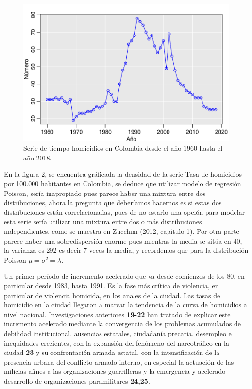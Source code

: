 \documentclass[a4paper]{article}\usepackage[]{graphicx}\usepackage[]{color}
\makeatletter
\def\maxwidth{ %
  \ifdim\Gin@nat@width>\linewidth
    \linewidth
  \else
    \Gin@nat@width
  \fi
}
\newenvironment{knitrout}{}{} %
\makeatother
\begin{document}
\begin{knitrout}
\color{fgcolor}\begin{figure}
\includegraphics[width=\maxwidth]{figure/unnamed-chunk-6-1} \caption[Serie de tiempo homicidios en Colombia desde el año 1960 hasta el año 2018]{Serie de tiempo homicidios en Colombia desde el año 1960 hasta el año 2018.}\label{fig:unnamed-chunk-6}
\end{figure}


\end{knitrout}

En la figura 2, se encuentra gráficada la densidad de la serie Tasa de homicidios por 100.000 habitantes en Colombia, se deduce que utilizar modelo de regresión Poisson, sería inapropiado pues parece haber una mixtura entre dos distribuciones, ahora la pregunta que deberíamos hacernos es si estas dos distribuciones están correlacionadas, pues de no estarlo una opción para modelar esta serie sería utilizar una mixtura entre dos o más distribuciones independientes, como se muestra en Zucchini (2012, capítulo 1). Por otra parte parece haber una sobredispersión enorme pues mientras la media se sitúa en 40, la varianza es 292 es decir 7 veces la media, y recordemos que para la distribución Poisson $\mu = \sigma^2 = \lambda$. 

Un primer período de incremento acelerado que va desde comienzos de los 80, en particular desde 1983, hasta 1991. Es la fase más crítica de violencia, en particular de violencia homicida, en los anales de la ciudad. Las tasas de homicidio en la ciudad llegaron a marcar la tendencia de la curva de homicidios a nivel nacional. Investigaciones anteriores \textbf{19-22} han tratado de explicar este incremento acelerado mediante la convergencia de los problemas acumulados de debilidad institucional, ausencias estatales, ciudadanía precaria, desempleo e inequidades crecientes, con la expansión del fenómeno del narcotráfico en la ciudad \textbf{23} y su confrontación armada estatal, con la intensificación de la presencia urbana del conflicto armado interno, en especial la actuación de las milicias afines a las organizaciones guerrilleras y la emergencia y acelerado desarrollo de organizaciones paramilitares \textbf{24,25}.
\end{document}
